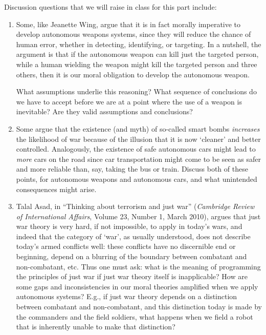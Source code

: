\documentclass[letta4 paper]{article}
\numberwithin{equation}{section}
\newcommand{\0}{\mathbf{0}}
\begin{document}
	Discussion questions that we will raise in class for this part include:
	\begin{enumerate}
		\item Some, like Jeanette Wing, argue that it is in fact morally imperative to develop autonomous weapons systems, since they will reduce the chance of human error, whether in detecting, identifying, or targeting. 
		In a nutshell, the argument is that if the autonomous weapon can kill just the targeted person, while a human wielding the weapon might kill the targeted person and three others, then it is our moral obligation to develop the autonomous weapon.
		
		What assumptions underlie this reasoning? 
		What sequence of conclusions do we have to accept before we are at a point where the use of a weapon is inevitable? 
		Are they valid assumptions and conclusions?
		
		\item Some argue that the existence (and myth) of so-called smart bombs \textit{increases} the likelihood of war because of the illusion that it is now `cleaner' and better controlled.
		Analogously, the existence of safe autonomous cars might lead to \textit{more} cars on the road since car transportation might come to be seen as safer and more reliable than, say, taking the bus or train.
		Discuss both of these points, for autonomous weapons and autonomous cars, and what unintended consequences might arise.
		
		\item Talal Asad, in ``Thinking about terrorism and just war'' (\textit{Cambridge Review of International Affairs}, Volume 23, Number 1, March 2010), argues that just war theory is very hard, if not impossible, to apply in today's wars, and indeed that the category of `war', as usually understood, does not describe today's armed conflicts well: these conflicts have no discernible end or beginning, depend on a blurring of the boundary between combatant and non-combatant, etc.
		Thus one must ask: what is the meaning of programming the principles of just war if just war theory itself is inapplicable?
		How are some gaps and inconsistencies in our moral theories amplified when we apply autonomous systems?
		E.g., if just war theory depends on a distinction between combatant and non-combatant, and this distinction today is made by the commanders and the field soldiers, what happens when we field a robot that is inherently unable to make that distinction?
	\end{enumerate}
	
\end{document}
